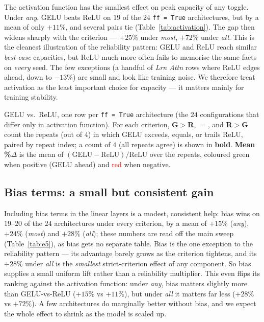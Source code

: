 \documentclass[11pt,a4paper]{article}
\begin{document}
The activation function has the smallest effect on peak capacity of any toggle. Under \emph{any}, GELU beats ReLU on $19$ of the $24$ \texttt{ff = True} architectures, but by a mean of only $+11\%$, and several pairs tie (Table~\ref{tab:activation}). The gap then widens sharply with the criterion --- $+25\%$ under \emph{most}, $+72\%$ under \emph{all}. This is the cleanest illustration of the reliability pattern: GELU and ReLU reach similar \emph{best-case} capacities, but ReLU much more often fails to memorise the same facts on \emph{every} seed. The few exceptions (a handful of \emph{Lrn Attn} rows where ReLU edges ahead, down to $-13\%$) are small and look like training noise. We therefore treat activation as the least important choice for capacity --- it matters mainly for training stability.

\begin{table}[ht]
\footnotesize
\setlength{\tabcolsep}{4pt}
\begin{adjustwidth}{-1.5cm}{-1.5cm}
\centering

\end{adjustwidth}
\caption{GELU vs.\ ReLU, one row per \texttt{ff = True} architecture (the $24$ configurations that differ only in activation function). For each criterion, \textbf{G$>$R}, \textbf{$=$}, and \textbf{R$>$G} count the repeats (out of $4$) in which GELU exceeds, equals, or trails ReLU, paired by repeat index; a count of $4$ (all repeats agree) is shown in \textbf{bold}. \textbf{Mean \%$\Delta$} is the mean of $(\text{GELU}-\text{ReLU})/\text{ReLU}$ over the repeats, coloured \textcolor{green!55!black}{green} when positive (GELU ahead) and \textcolor{red}{red} when negative.}
\label{tab:activation}
\end{table}

\subsection{Bias terms: a small but consistent gain}

Including bias terms in the linear layers is a modest, consistent help: bias wins on $19$--$20$ of the $24$ architectures under every criterion, by a mean of $+15\%$ (\emph{any}), $+24\%$ (\emph{most}) and $+28\%$ (\emph{all}); these numbers are read off the main sweep (Table~\ref{tab:e5}), as bias gets no separate table. Bias is the one exception to the reliability pattern --- its advantage barely grows as the criterion tightens, and its $+28\%$ under \emph{all} is the \emph{smallest} strict-criterion effect of any component. So bias supplies a small uniform lift rather than a reliability multiplier. This even flips its ranking against the activation function: under \emph{any}, bias matters slightly more than GELU-vs-ReLU ($+15\%$ vs $+11\%$), but under \emph{all} it matters far less ($+28\%$ vs $+72\%$). A few architectures do marginally better without bias, and we expect the whole effect to shrink as the model is scaled up.
\end{document}

